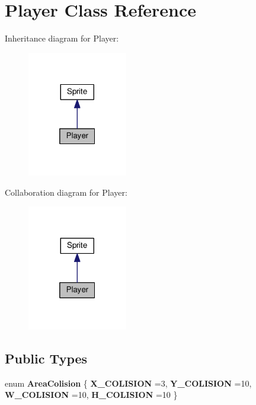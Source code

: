 \hypertarget{class_player}{}\section{Player Class Reference}
\label{class_player}


Inheritance diagram for Player\+:\nopagebreak
\begin{figure}[H]
\begin{center}
\leavevmode
\includegraphics[width=124pt]{class_player__inherit__graph}
\end{center}
\end{figure}


Collaboration diagram for Player\+:\nopagebreak
\begin{figure}[H]
\begin{center}
\leavevmode
\includegraphics[width=124pt]{class_player__coll__graph}
\end{center}
\end{figure}
\subsection*{Public Types}
\begin{DoxyCompactItemize}
\item 
enum {\bfseries Area\+Colision} \{ {\bfseries X\+\_\+\+C\+O\+L\+I\+S\+I\+ON} =3, 
{\bfseries Y\+\_\+\+C\+O\+L\+I\+S\+I\+ON} =10, 
{\bfseries W\+\_\+\+C\+O\+L\+I\+S\+I\+ON} =10, 
{\bfseries H\+\_\+\+C\+O\+L\+I\+S\+I\+ON} =10
 \}\hypertarget{class_player_a5adb8322334d4fe192ea48350919ed75}{}\label{class_player_a5adb8322334d4fe192ea48350919ed75}

\end{DoxyCompactItemize}
